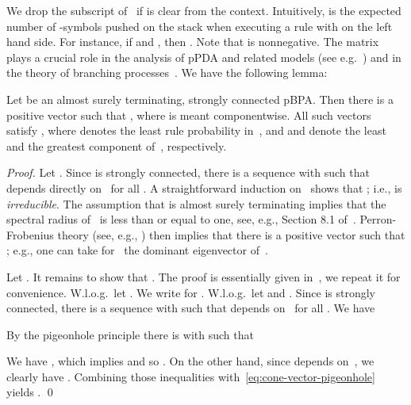 We drop the subscript of~ if  is clear from the context.
Intuitively,  is the expected number of -symbols pushed on the stack when executing a rule with  on the left hand side.
For instance, if  and , then .
Note that  is nonnegative.
The matrix~ plays a crucial role in the analysis of pPDA and related models (see e.g.~\cite{EY:RMC-SG-equations-JACM})
 and in the theory of branching processes~\cite{Harris:book}.
We have the following lemma:
\begin{lemma} \label{lem:cone-vector}
 Let  be an almost surely terminating, strongly connected pBPA.
 Then there is a positive vector  such that
  , where  is meant componentwise.
 All such vectors~ satisfy ,
  where  denotes the least rule probability in~,
  and  and  denote the least and the greatest component of~, respectively.
\end{lemma}
\begin{proof}
  Let .
  Since  is strongly connected, there is a sequence  with  such that  depends directly on~
   for all .
  A straightforward induction on~ shows that ; i.e.,  is {\em irreducible}.
  The assumption that  is almost surely terminating implies that
   the spectral radius of~ is less than or equal to one, see, e.g., Section 8.1 of~\cite{EY:RMC-SG-equations-JACM}.
Perron-Frobenius theory (see, e.g., \cite{book:BermanP}) then implies that there is a positive vector  such that
   ;
   e.g., one can take for~ the dominant eigenvector of~.

  Let .
  It remains to show that .
  The proof is essentially given in~\cite{EKL10:SICOMP}, we repeat it for convenience.
  W.l.o.g.\ let .
  We write  for .
  W.l.o.g.\ let  and .
  Since  is strongly connected, there is a sequence  with 
   such that  depends on~ for all .
  We have
   
  By the pigeonhole principle there is  with  such that
   
  We have , which implies  and so .
  On the other hand, since  depends on~, we clearly have .
  Combining those inequalities with~\eqref{eq:cone-vector-pigeonhole} yields .
\qed
\end{proof}

